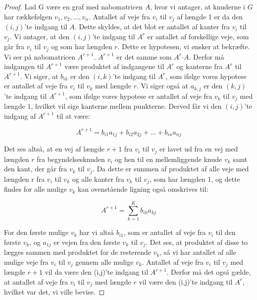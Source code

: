 \begin{proof}
Lad G være en graf med nabomatricen 
\textbf{$A$}, hvor vi antager, at knuderne i $G$ har rækkefølgen $v_{1},v_{2},\dotsc,v_{n}$. Antallet af veje fra $v_{i}$ til $v_{j}$ af længde 1 er da den $(i,j)$'te indgang til 
\textbf{$A$}. Dette skyldes, at det blot er antallet af kanter fra $v_{i}$ til $v_{j}$.
Vi antager, at den $(i,j)$'te indgang til 
\textbf{${A^r}$} er antallet af forskellige veje, som går fra $v_{i}$ til $v_{j}$ og som har længden $r$. Dette er hypotesen, vi ønsker at bekræfte.
Vi ser på nabomatricen \textbf{$A^{r+1}$}. 
\textbf{$A^{r+1}$} er det samme som 
\textbf{$A^{r}$}$\cdot$\textbf{$A$}. Derfor må indgangen til \textbf{$A^{r+1}$} være produktet af indgangene til \textbf{$A^{r}$} og kanterne fra \textbf{$A^{r}$} til \textbf{$A^{r+1}$}. Vi siger, at $b_{ik}$ er den $(i,k)$'te indgang til 
\textbf{$A^{r}$}, som ifølge vores hypotese er antallet af veje fra $v_{i}$ til $v_{k}$ med længde $r$. Vi siger også at $a_{k,j}$ er den $(k,j)$'te indgang til 
\textbf{$A^{r+1}$}, som ifølge vores hypotese er antallet af veje fra $v_{k}$ til $v_{j}$ med længde $1$, hvilket vil sige kanterne mellem punkterne. Derved får vi den $(i,j)$'te indgang af \textbf{$A^{r+1}$} til at være: 

\begin{equation}
A^{r+1}=b_{i1}a_{1j} + b_{i2}a_{2j} +\dotsc+ b_{in}a_{nj}
\end{equation}

Det ses altså, at en vej af længde $r + 1$ fra $v_{i}$ til $v_{j}$ er lavet ud fra en vej med længden $r$ fra begyndelsesknuden $v_{i}$ og hen til en mellemliggende knude $v_{k}$ samt den kant, der går fra $v_{k}$ til $v_{j}$. 
Da dette er summen af produktet af alle veje med længden r fra $v_{i}$ til $v_{k}$ og alle kanter fra $v_{k}$ til $v_{j}$, som har længden 1, og dette findes for alle mulige $v_{k}$ kan ovenstående ligning også omskrives til: 

\begin{equation}
A^{r+1}=\sum_{k=1}^{K} b_{ik} a_{kj}
\end{equation}

For den første mulige $v_{k}$ har vi altså $b_{i1}$, som er antallet af veje fra $v_{i}$ til den første $v_{k}$, og $a_{1j}$ er vejen fra den første $v_{k}$ til $v_{j}$. Det ses, at produktet af disse to lægges sammen med produktet for de resterende $v_{k}$, så vi har antallet af alle mulige veje fra $v_{i}$ til $v_{j}$ gennem alle mulige $v_{k}$. Antallet af veje fra $v_{i}$ til $v_{j}$ med længde $r+1$ vil da være den (i,j)'te indgang til $A^{r+1}$. Derfor må det også gælde, at antallet af veje fra $v_{i}$ til $v_{j}$ med længde $r$ vil være den (i,j)'te indgang til $A^{r}$, hvilket var det, vi ville bevise.

\end{proof}


